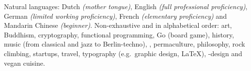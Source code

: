 \documentclass[10pt,a4paper]{article}
\begin{document}
\vspace{0.5em}
\inlineheadsection
  {Natural languages:}
  {Dutch \emph{(mother tongue)}, English \emph{(full professional proficiency)}, German \emph{(limited working proficiency)}, French \emph{(elementary proficiency)} and Mandarin Chinese \emph{(beginner)}.}
\spacedhrule{1.6em}{-0.4em}
\inlineheadsection
  {Non-exhaustive and in alphabetical order:}
  {art, Buddhism, cryptography, functional programming, Go (board game), history, music (from classical and jazz to Berlin-techno), , permaculture, philosophy, rock climbing, startups, travel, typography (e.g.\ graphic design, \LaTeX), -design and vegan cuisine.}
\end{document}

